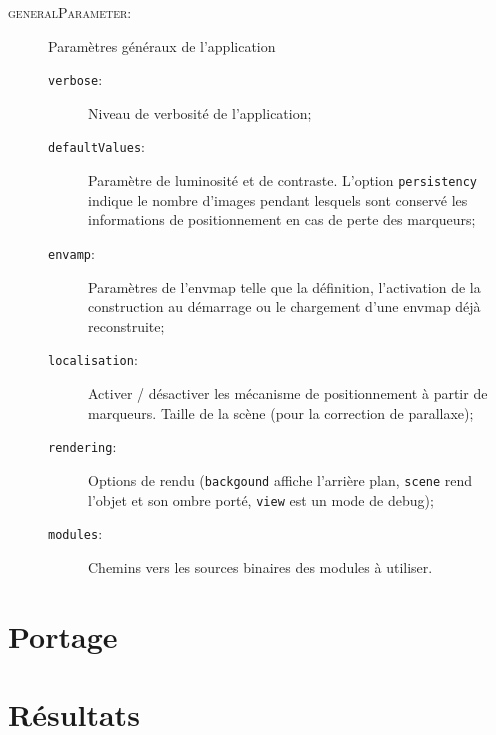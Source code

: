 \documentclass[10pt,a4paper,twoside, twocolumn]{report}
\newcommand*{\rootPath}{../}
\begin{document}
\begin{description}
	\item[\textsc{generalParameter}:]		Paramètres généraux de l'application
		\begin{description}
			\item[\texttt{verbose}:]				Niveau de verbosité de l'application;
			\item[\texttt{defaultValues}:]	Paramètre de luminosité et de contraste. L’option \texttt{persistency} indique le nombre d'images pendant lesquels sont conservé les informations de positionnement en cas de perte des marqueurs;
			\item[\texttt{envamp}:]					Paramètres de l'envmap telle que la définition, l'activation de la construction au démarrage ou le chargement d'une envmap déjà reconstruite;
			\item[\texttt{localisation}:]		Activer / désactiver les mécanisme de positionnement à partir de marqueurs. Taille de la scène (pour la correction de parallaxe);
			\item[\texttt{rendering}:]			Options de rendu (\texttt{backgound} affiche l’arrière plan, \texttt{scene} rend l'objet et son ombre porté, \texttt{view} est un mode de debug);
			\item[\texttt{modules}:]				Chemins vers les sources binaires des modules à utiliser.
		\end{description}
		
\end{description}




\section{Portage}




\section{Résultats}



\ifstandalone
	
	
\fi
\end{document}
